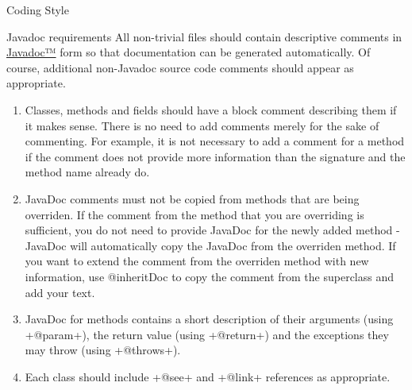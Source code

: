 \begin{section}{Coding Style}
\begin{subsection}{Javadoc requirements}
All non-trivial files should contain descriptive comments in \href{http://www.oracle.com/technetwork/java/javase/documentation/index-jsp-135444.html}{Javadoc™} form so that documentation can be generated automatically. Of course, additional non-Javadoc source code comments should appear as appropriate.
\begin{enumerate}
  \item Classes, methods and fields should have a block comment describing them if it makes sense. There is no need to add comments merely for the sake of commenting. For example, it is not necessary to add a comment for a method if the comment does not provide more information than the signature and the method name already do.
  \item JavaDoc comments must not be copied from methods that are being overriden. If the comment from the method that you are overriding is sufficient, you do not need to provide JavaDoc for the newly added method - JavaDoc will automatically copy the JavaDoc from the overriden method. If you want to extend the comment from the overriden method with new information, use {@inheritDoc} to copy the comment from the superclass and add your text.
  \item JavaDoc for methods contains a short description of their arguments (using \spverb+@param+), the return value (using \spverb+@return+) and the exceptions they may throw (using \spverb+@throws+).
  \item Each class should include \spverb+@see+ and \spverb+@link+ references as appropriate.
\end{enumerate}
\end{subsection}

\end{section}
